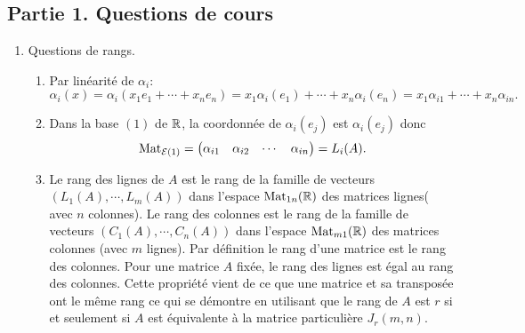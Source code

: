 \subsection*{Partie 1. Questions de cours}
\begin{enumerate}
  \item Questions de rangs.
  \begin{enumerate}
    \item Par linéarité de $\alpha_i$:
\[
  \alpha_i(x) = \alpha_i(x_1e_1 + \cdots + x_ne_n) = x_1\alpha_i(e_1)+\cdots + x_n\alpha_i(e_n)
  = x_1 \alpha_{i 1} + \cdots + x_n \alpha_{i n}.
\]

    \item Dans la base $(1)$ de $\mathbb{R}$, la coordonnée de $\alpha_i(e_j)$ est $\alpha_i(e_j)$ donc
\[
  \operatorname{Mat}_{\mathcal{E} (1)} =
  \begin{pmatrix}
    \alpha_{i 1} & \alpha_{i 2} & \cdots &\alpha_{i n}
  \end{pmatrix}
  = L_i(A).
\]

    \item Le rang des lignes de $A$ est le rang de la famille de vecteurs $\left(L_1(A),\cdots, L_m(A)\right)$ dans l'espace $\operatorname{Mat}_{1 n}(\mathbb{R})$ des matrices lignes( avec $n$ colonnes).\newline
    Le rang des colonnes est le rang de la famille de vecteurs $\left(C_1(A),\cdots, C_n(A)\right)$ dans l'espace $\operatorname{Mat}_{m 1}(\mathbb{R})$ des matrices colonnes (avec $m$ lignes).\newline
    Par définition le rang d'une matrice est le rang des colonnes.\newline
    Pour une matrice $A$ fixée, le rang des lignes est égal au rang des colonnes. Cette propriété vient de ce que une matrice et sa transposée ont le même rang ce qui se démontre en utilisant que le rang de $A$ est $r$ si et seulement si $A$ est équivalente à la matrice particulière $J_r(m,n)$.
  \end{enumerate}


\end{enumerate}
